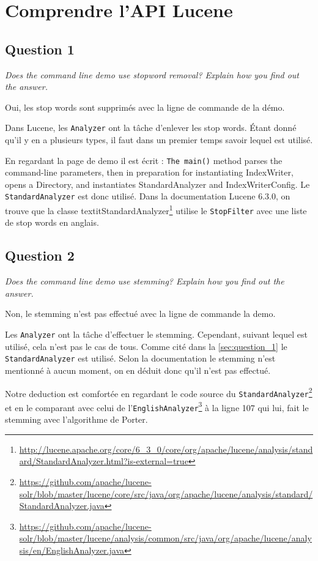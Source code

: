 \chapter{Comprendre l'API Lucene}

\section{Question 1}
\label{sec:question_1}
\textit{Does the command line demo use stopword removal? Explain how you find out the answer.}

Oui, les stop words sont supprimés avec la ligne de commande de la démo.

Dans Lucene, les \texttt{Analyzer} ont la tâche d'enlever les stop words. Étant donné qu'il y en a plusieurs types, il faut dans un premier temps savoir lequel est utilisé. 

En regardant la page de demo il est écrit : \texttt{The main()} method parses the command-line parameters, then in preparation for instantiating IndexWriter, opens a Directory, and instantiates StandardAnalyzer and IndexWriterConfig.
Le \texttt{StandardAnalyzer} est donc utilisé. Dans la documentation Lucene 6.3.0, on trouve que la classe textit{StandardAnalyzer}\footnote{\url{http://lucene.apache.org/core/6_3_0/core/org/apache/lucene/analysis/standard/StandardAnalyzer.html?is-external=true}} utilise le \texttt{StopFilter} avec une liste de stop words en anglais.

\section{Question 2}
\textit{Does the command line demo use stemming? Explain how you find out the answer.}

Non, le stemming n'est pas effectué avec la ligne de commande la demo.

Les \texttt{Analyzer} ont la tâche d'effectuer le stemming. Cependant, suivant lequel est utilisé, cela n'est pas le cas de tous. Comme cité dans la \autoref{sec:question_1} le \texttt{StandardAnalyzer} est utilisé. Selon la documentation le stemming n'est mentionné à aucun moment, on en déduit donc qu'il n'est pas effectué.

Notre deduction est comfortée en regardant le code source du \texttt{StandardAnalyzer}\footnote{\url{https://github.com/apache/lucene-solr/blob/master/lucene/core/src/java/org/apache/lucene/analysis/standard/StandardAnalyzer.java}} et en le comparant avec celui de l'\texttt{EnglishAnalyzer}\footnote{\url{https://github.com/apache/lucene-solr/blob/master/lucene/analysis/common/src/java/org/apache/lucene/analysis/en/EnglishAnalyzer.java}} à la ligne 107 qui lui, fait le stemming avec l'algorithme de Porter.

